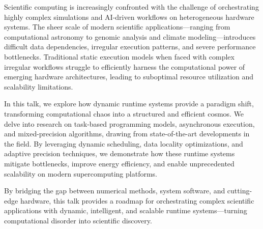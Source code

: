 Scientific computing is increasingly confronted with the challenge of orchestrating highly complex simulations and AI-driven workflows on heterogeneous hardware systems. The sheer scale of modern scientific applications—ranging from computational astronomy to genomic analysis and climate modeling—introduces difficult data dependencies, irregular execution patterns, and severe performance bottlenecks. Traditional static execution models when faced with complex irregular workflows struggle to efficiently harness the computational power of emerging hardware architectures, leading to suboptimal resource utilization and scalability limitations.  

In this talk, we explore how dynamic runtime systems provide a paradigm shift, transforming computational chaos into a structured and efficient cosmos. We delve into research on task-based programming models, asynchronous execution, and mixed-precision algorithms, drawing from state-of-the-art developments in the field. By leveraging dynamic scheduling, data locality optimizations, and adaptive precision techniques, we demonstrate how these runtime systems mitigate bottlenecks, improve energy efficiency, and enable unprecedented scalability on modern supercomputing platforms.  

By bridging the gap between numerical methods, system software, and cutting-edge hardware, this talk provides a roadmap for orchestrating complex scientific applications with dynamic, intelligent, and scalable runtime systems—turning computational disorder into scientific discovery.
